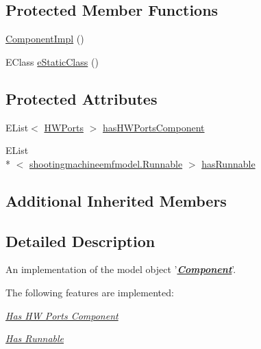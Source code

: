 \subsection*{Protected Member Functions}
\begin{DoxyCompactItemize}
\item 
\hyperlink{classshootingmachineemfmodel_1_1impl_1_1_component_impl_a4bb386e3f794193d542bb0b047206e48}{Component\-Impl} ()
\item 
E\-Class \hyperlink{classshootingmachineemfmodel_1_1impl_1_1_component_impl_afb09ad15b9b007946e72330c332d6a8c}{e\-Static\-Class} ()
\end{DoxyCompactItemize}
\subsection*{Protected Attributes}
\begin{DoxyCompactItemize}
\item 
E\-List$<$ \hyperlink{interfaceshootingmachineemfmodel_1_1_h_w_ports}{H\-W\-Ports} $>$ \hyperlink{classshootingmachineemfmodel_1_1impl_1_1_component_impl_a0ab625a8e329a7f772ee3770e82a4831}{has\-H\-W\-Ports\-Component}
\item 
E\-List\\*
$<$ \hyperlink{interfaceshootingmachineemfmodel_1_1_runnable}{shootingmachineemfmodel.\-Runnable} $>$ \hyperlink{classshootingmachineemfmodel_1_1impl_1_1_component_impl_ade2868233b071fba708d74f608e7103a}{has\-Runnable}
\end{DoxyCompactItemize}
\subsection*{Additional Inherited Members}


\subsection{Detailed Description}
An implementation of the model object '{\itshape {\bfseries \hyperlink{interfaceshootingmachineemfmodel_1_1_component}{Component}}}'.

The following features are implemented\-: 
\begin{DoxyItemize}
\item \hyperlink{classshootingmachineemfmodel_1_1impl_1_1_component_impl_a278ec36c9c5c095e447ab6623e7c5900}{{\itshape Has H\-W Ports Component}} 
\item \hyperlink{classshootingmachineemfmodel_1_1impl_1_1_component_impl_ad5149ad613dfe9c0e5fdd8db70d7df1d}{{\itshape Has Runnable}} 
\end{DoxyItemize}


